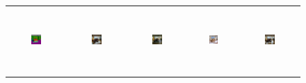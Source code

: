 \begin{figure}[]
\begin{tabular} {cc|cc|c}
\includegraphics[width=0.1932\textwidth,height=0.96in]{Images/Rec/ADE/label/ADE_val_00000532.png} & \includegraphics[width=0.1932\textwidth,height=0.96in]{Images/Rec/ADE/gt/ADE_val_00000532.jpg} &
\includegraphics[width=0.1932\textwidth,height=0.96in]{Images/Rec/ADE/pix2pixhd/ADE_val_00000532.jpg} &   \includegraphics[width=0.1932\textwidth,height=0.80in]{Images/Rec/ADE/spade/ADE_val_00000532.jpg} &  \includegraphics[width=0.1932\textwidth,height=0.96in]{Images/Rec/ADE/ours/ADE_val_00000532.png} \\


\end{tabular}
\end{figure}
